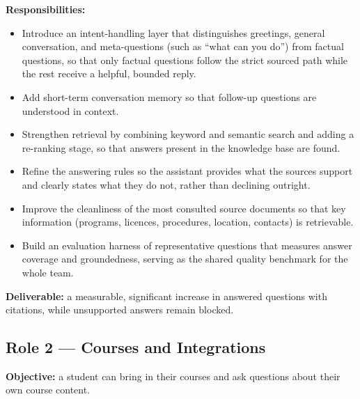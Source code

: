 \documentclass[11pt,a4paper]{article}
\begin{document}
\textbf{Responsibilities:}
\begin{itemize}
  \item Introduce an intent-handling layer that distinguishes greetings, general
        conversation, and meta-questions (such as ``what can you do'') from factual
        questions, so that only factual questions follow the strict sourced path
        while the rest receive a helpful, bounded reply.
  \item Add short-term conversation memory so that follow-up questions are understood
        in context.
  \item Strengthen retrieval by combining keyword and semantic search and adding a
        re-ranking stage, so that answers present in the knowledge base are found.
  \item Refine the answering rules so the assistant provides what the sources support
        and clearly states what they do not, rather than declining outright.
  \item Improve the cleanliness of the most consulted source documents so that key
        information (programs, licences, procedures, location, contacts) is retrievable.
  \item Build an evaluation harness of representative questions that measures answer
        coverage and groundedness, serving as the shared quality benchmark for the
        whole team.
\end{itemize}

\textbf{Deliverable:} a measurable, significant increase in answered questions with
citations, while unsupported answers remain blocked.

\subsection{Role 2 --- Courses and Integrations}
\textbf{Objective:} a student can bring in their courses and ask questions about their
own course content.
\end{document}

